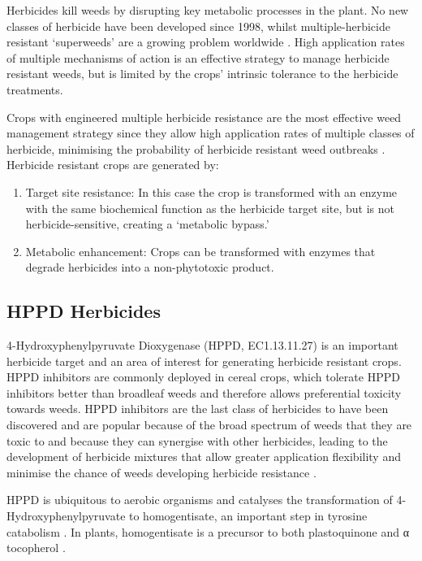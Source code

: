 \documentclass[16pt]{book}
\begin{document}
Herbicides kill weeds by disrupting key metabolic processes in the plant. 
No new classes of herbicide have been developed since 1998, whilst multiple-herbicide resistant ‘superweeds’ are a growing problem worldwide \cite{norsworthy2012reducing}. 
High application rates of multiple mechanisms of action is an effective strategy to manage herbicide resistant weeds, but is limited by the crops’ intrinsic tolerance to the herbicide treatments.


Crops with engineered multiple herbicide resistance are the most effective weed management strategy since they allow high application rates of multiple classes of herbicide, minimising the probability of herbicide resistant weed outbreaks \cite{green2012benefits}. Herbicide resistant crops are generated by:
\begin{enumerate}
	\item Target site resistance: In this case the crop is transformed with an enzyme with the same biochemical function as the herbicide target site, but is not herbicide-sensitive, creating a ‘metabolic bypass.’
	\item Metabolic enhancement: Crops can be transformed with enzymes that degrade herbicides into a non-phytotoxic product.
\end{enumerate}

\subsection{HPPD Herbicides}
4-Hydroxyphenylpyruvate Dioxygenase (HPPD, EC1.13.11.27) is an important herbicide target and an area of interest for generating herbicide resistant crops. 
HPPD inhibitors are commonly deployed in cereal crops, which tolerate HPPD inhibitors better than broadleaf weeds and therefore allows preferential toxicity towards weeds. 
HPPD inhibitors are the last class of herbicides to have been discovered and are popular because of the broad spectrum of weeds that they are toxic to and because they can synergise with other herbicides, leading to the development of herbicide mixtures that allow greater application flexibility and minimise the chance of weeds developing herbicide resistance \cite{kaundun2017mechanism}.


HPPD is ubiquitous to aerobic organisms and catalyses the transformation of 4-Hydroxyphenylpyruvate to homogentisate, an important step in tyrosine catabolism \cite{moran20054}. In plants, homogentisate is a precursor to both plastoquinone and α tocopherol \cite{soll1980tocopherol}. 
\end{document}

